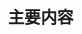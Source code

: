 \documentclass{beamer}
\begin{document}
\begin{CJK}{UTF8}{gbsn}     %

    \begin{frame}
        \frametitle{主要内容}
    \end{frame}

\end{CJK}
\end{document}
